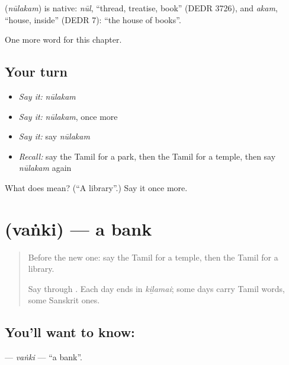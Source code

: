 \begin{cousinweb}
\textbf{} (\emph{nūlakam}) is native: \emph{nūl}, \textquotedblleft{}thread, treatise, book\textquotedblright{} (DEDR 3726), and \emph{akam}, \textquotedblleft{}house, inside\textquotedblright{} (DEDR 7): \textquotedblleft{}the house of books\textquotedblright{}.
\end{cousinweb}

\begin{grammarlens}[title={What you've built}]
One more word for this chapter.
\end{grammarlens}

\subsection*{Your turn}
\begin{itemize}
\raggedright
  \item \emph{Say it:} \emph{nūlakam}
  \item \emph{Say it:} \emph{nūlakam}, once more
  \item \emph{Say it:} say \emph{nūlakam}
  \item \emph{Recall:} say the Tamil for a park, then the Tamil for a temple, then say \emph{nūlakam} again
\end{itemize}

\begin{tcolorbox}[breakable,colback=teal!4,colframe=teal!35!black,title={Before you move on}]
What does  mean? (\textquotedblleft{}A library\textquotedblright{}.) Say it once more.
\end{tcolorbox}
\section[\texorpdfstring{\ta{வங்கி} (vaṅki)}{வங்கி (vaṅki)}]{ (vaṅki) — a bank}

\label{lesson:TA-C115-vanki}



\begin{quote}
Before the new one: say the Tamil for a temple, then the Tamil for a library.

Say \textbf{} through \textbf{}. Each day ends in \emph{kiḻamai}; some days carry Tamil words, some Sanskrit ones.
\end{quote}

\subsection*{You'll want to know: }
\textbf{} — \emph{vaṅki} — \textquotedblleft{}a bank\textquotedblright{}.

